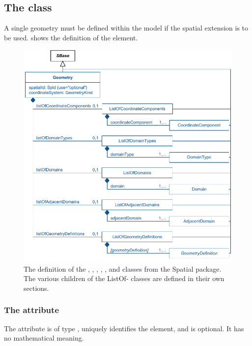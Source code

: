 \subsection{The  class}
\label{Geometry-class}
\label{ListOfCoordinateComponents-class}
\label{ListOfDomainTypes-class}
\label{ListOfDomains-class}
\label{ListOfAdjacentDomains-class}
\label{ListOfGeometryDefinitions-class}

A single geometry must be defined within the model if the spatial extension is to be used.  shows the definition of the \Geometry element.
 
\begin{figure}[ht]
  \includegraphics{figs/Geometry-uml}
  \caption{The definition of the \Geometry, \ListOfCoordinateComponents, \ListOfDomainTypes, \ListOfDomains, \ListOfAdjacentDomains, and \ListOfGeometryDefinitions classes from the Spatial package.  The various children of the ListOf- classes are defined in their own sections.}
  \label{Geometry-uml}
  \label{ListOfCoordinateComponents-uml}
  \label{ListOfDomainTypes-uml}
  \label{ListOfDomains-uml}
  \label{ListOfAdjacentDomains-uml}
  \label{ListOfGeometryDefinitions-uml}
\end{figure}

\subsubsection{The  attribute}
The  attribute is of type , uniquely identifies the \Geometry element, and is optional.  It has no mathematical meaning.

